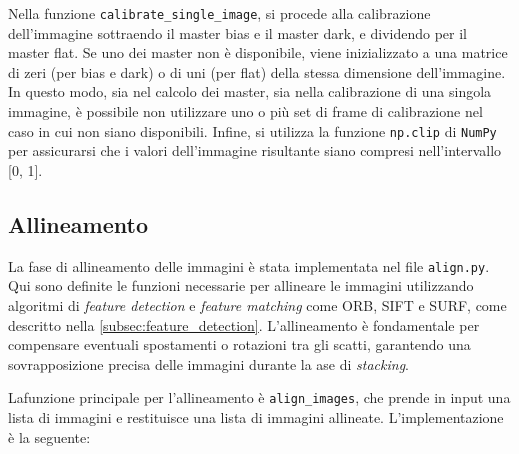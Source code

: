Nella funzione \texttt{calibrate\_single\_image}, si procede alla calibrazione dell'immagine sottraendo il master bias e il master dark, e dividendo per il master flat. Se uno dei master non è disponibile, viene inizializzato a una matrice di zeri (per bias e dark) o di uni (per flat) della stessa dimensione dell'immagine. In questo modo, sia nel calcolo dei master, sia nella calibrazione di una singola immagine, è possibile non utilizzare uno o più set di frame di calibrazione nel caso in cui non siano disponibili. Infine, si utilizza la funzione \texttt{np.clip} di \texttt{NumPy} per assicurarsi che i valori dell'immagine risultante siano compresi nell'intervallo [0, 1].

\subsection{Allineamento} \label{subsec:alignment_impl}

La fase di allineamento delle immagini è stata implementata nel file \texttt{align.py}. Qui sono definite le funzioni necessarie per allineare le immagini utilizzando algoritmi di \textit{feature detection} e \textit{feature matching} come ORB, SIFT e SURF, come descritto nella \cref{subsec:feature_detection}. L'allineamento è fondamentale per compensare eventuali spostamenti o rotazioni tra gli scatti, garantendo una sovrapposizione precisa delle immagini durante la ase di \textit{stacking}.

Lafunzione principale per l'allineamento è \texttt{align\_images}, che prende in input una lista di immagini e restituisce una lista di immagini allineate. L'implementazione è la seguente:

